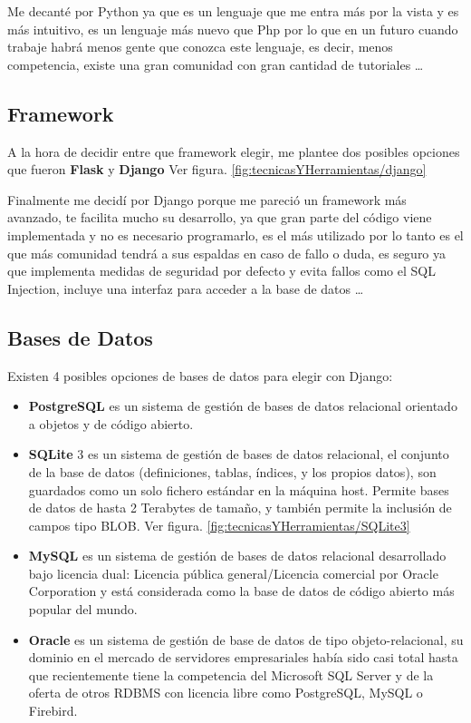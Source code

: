 Me decanté por Python ya que es un lenguaje que me entra más por la vista y es más intuitivo, es un lenguaje más nuevo que Php por lo que en un futuro cuando trabaje habrá menos gente que conozca este lenguaje, es decir, menos competencia, existe una gran comunidad con gran cantidad de tutoriales \ldots

\newpage
\subsection{Framework}

A la hora de decidir entre que framework elegir, me plantee dos posibles opciones que fueron \textbf{Flask} \cite{Flask} y \textbf{Django} \cite{Django} Ver figura. \ref{fig:tecnicasYHerramientas/django}

Finalmente me decidí por Django porque me pareció un framework más avanzado, te facilita mucho su desarrollo, ya que gran parte del código viene implementada y no es necesario programarlo, es el más utilizado por lo tanto es el que más comunidad tendrá a sus espaldas en caso de fallo o duda, es seguro ya que implementa medidas de seguridad por defecto y evita fallos como el SQL Injection, incluye una interfaz para acceder a la base de datos \ldots


\subsection{Bases de Datos}

Existen 4 posibles opciones de bases de datos para elegir con Django:
	\begin{itemize}
	\item \textbf{PostgreSQL} \cite{PostgreSQL} es un sistema de gestión de bases de datos relacional orientado a objetos y de código abierto. 
	\item \textbf{SQLite} 3 \cite{SQLite3} es un sistema de gestión de bases de datos relacional, el conjunto de la base de datos (definiciones, tablas, índices, y los propios datos), son guardados como un solo fichero estándar en la máquina host. Permite bases de datos de hasta 2 Terabytes de tamaño, y también permite la inclusión de campos tipo BLOB. Ver figura. \ref{fig:tecnicasYHerramientas/SQLite3}
	\item \textbf{MySQL} \cite{MySQL} es un sistema de gestión de bases de datos relacional desarrollado bajo licencia dual: Licencia pública general/Licencia comercial por Oracle Corporation y está considerada como la base de datos de código abierto más popular del mundo.
	\item \textbf{Oracle} \cite{Oracle} es un sistema de gestión de base de datos de tipo objeto-relacional, su dominio en el mercado de servidores empresariales había sido casi total hasta que recientemente tiene la competencia del Microsoft SQL Server y de la oferta de otros RDBMS con licencia libre como PostgreSQL, MySQL o Firebird.
	\end{itemize}

